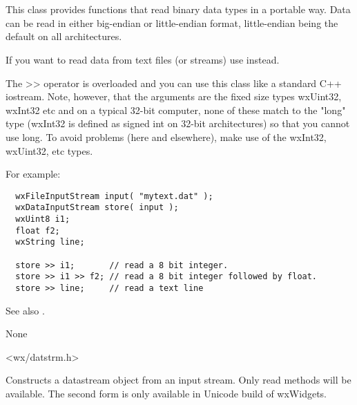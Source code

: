 \section{}\label{wxdatainputstream}

This class provides functions that read binary data types in a
portable way. Data can be read in either big-endian or little-endian
format, little-endian being the default on all architectures.

If you want to read data from text files (or streams) use 
 instead.

The >> operator is overloaded and you can use this class like a standard C++ iostream.
Note, however, that the arguments are the fixed size types wxUint32, wxInt32 etc
and on a typical 32-bit computer, none of these match to the "long" type (wxInt32
is defined as signed int on 32-bit architectures) so that you cannot use long. To avoid
problems (here and elsewhere), make use of the wxInt32, wxUint32, etc types.

For example:

\begin{verbatim}
  wxFileInputStream input( "mytext.dat" );
  wxDataInputStream store( input );
  wxUint8 i1;
  float f2;
  wxString line;

  store >> i1;       // read a 8 bit integer.
  store >> i1 >> f2; // read a 8 bit integer followed by float.
  store >> line;     // read a text line
\end{verbatim}

See also . 


None


<wx/datstrm.h>


\label{wxdatainputstreamconstr}



Constructs a datastream object from an input stream. Only read methods will
be available. The second form is only available in Unicode build of wxWidgets.

